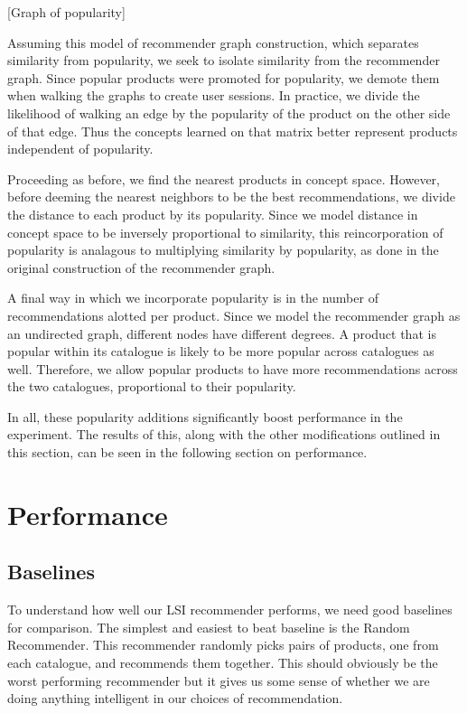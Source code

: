 \documentclass[11pt]{article}
\begin{document}
[Graph of popularity]

Assuming this model of recommender graph construction, which separates similarity
from popularity, we seek to isolate similarity from the recommender graph. Since
popular products were promoted for popularity, we demote them when walking the
graphs to create user sessions. In practice, we divide the likelihood of walking
an edge by the popularity of the product on the other side of that edge. Thus
the concepts learned on that matrix better represent products independent of
popularity. 

Proceeding as before, we find the nearest products in concept space. However,
before deeming the nearest neighbors to be the best recommendations, we divide
the distance to each product by its popularity. Since we model distance in 
concept space to be inversely proportional to similarity, this reincorporation
of popularity is analagous to multiplying similarity by popularity, as done in
the original construction of the recommender graph.

A final way in which we incorporate popularity is in the number of
recommendations alotted per product. Since we model the recommender graph as an
undirected graph, different nodes have different degrees. A product that is
popular within its catalogue is likely to be more popular across catalogues as
well. Therefore, we allow popular products to have more recommendations across
the two catalogues, proportional to their popularity.

In all, these popularity additions significantly boost performance in the
experiment. The results of this, along with the other modifications outlined in
this section, can be seen in the following section on performance.

\section*{Performance}
\subsection*{Baselines}
To understand how well our LSI recommender performs, we need good baselines
for comparison.  The simplest and easiest to beat baseline is the Random 
Recommender. This recommender randomly picks pairs of products, one from 
each catalogue, and recommends them together. This should obviously be the 
worst performing recommender but it gives us some sense of whether we are 
doing anything intelligent in our choices of recommendation.
\end{document}
